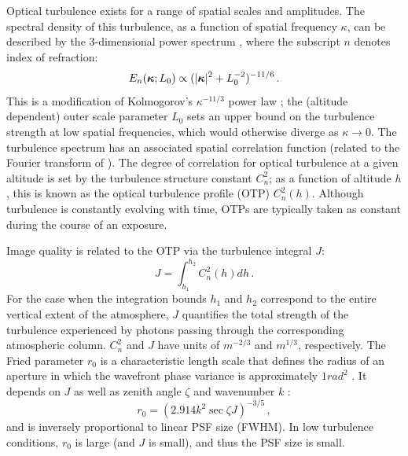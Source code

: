 \documentclass[twocolumn]{aastex631}
\begin{document}
Optical turbulence exists for a range of spatial scales and amplitudes.
The spectral density of this turbulence, as a function of spatial frequency $\kappa$, can be described by the 3-dimensional \vk power spectrum \citep{von_karman_progress_1948, tokovinin_wavefront_1998}, where the subscript $n$ denotes index of refraction:
\begin{equation}\label{eqn:vk}
    E_n(\vect{\kappa};L_0) \propto ( \lvert \vect{\kappa} \rvert^2 + L_0^{-2})^{-11/6} \,.
\end{equation}
This is a modification of Kolmogorov's $\kappa^{-11/3}$ power law \citep{kolmogorov_local_1941}; the (altitude dependent) outer scale parameter $L_0$
sets an upper bound on the turbulence strength at low spatial frequencies, which would otherwise diverge as $\kappa \rightarrow 0$.
The \vk turbulence spectrum has an associated spatial correlation function (related to the Fourier transform of ). 
The degree of correlation for optical turbulence at a given altitude is set by the turbulence structure constant $C_n^2$; 
as a function of altitude $h$, this is known as the optical turbulence profile (OTP) $C_n^2(h)$. 
Although turbulence is constantly evolving with time, OTPs are typically taken as constant during the course of an exposure.

Image quality is related to the OTP via the turbulence integral $J$:
\begin{equation} \label{eqn:j}
	J = \int_{h_1}^{h_2} C_n^2(h) dh \,.
\end{equation}
For the case when the integration bounds $h_1$ and $h_2$ correspond to the entire vertical extent of the atmosphere, $J$ quantifies the total strength of the turbulence experienced by photons passing through the corresponding atmospheric column.
$C_n^2$ and $J$ have units of $\unit{m^{-2/3}}$ and $\unit{m^{1/3}}$, respectively. 
The Fried parameter $r_0$ is a characteristic length scale that defines the radius of an aperture in which the wavefront phase variance is approximately $ 1\unit{rad^2}$ \citep{fried_statistics_1965}. 
It depends on $J$ as well as zenith angle $\zeta$ and wavenumber $k$ \citep{roddier_v_1981}:
\begin{equation} \label{eqn:r0}
	r_0 = (2.914 k^2 \sec \zeta J )^{-3/5}\,,
\end{equation}
and is inversely proportional to linear PSF size (FWHM).
In low turbulence conditions, $r_0$ is large (and $J$ is small), and thus the PSF size is small. 
\end{document}
